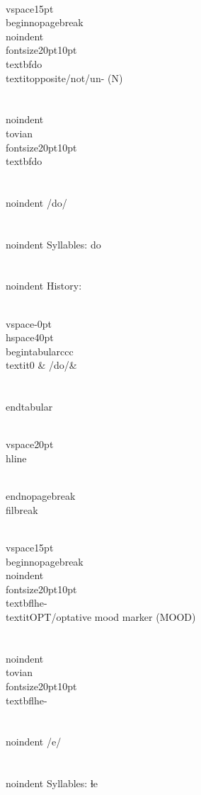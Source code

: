 \\vspace{15pt}
\\begin{nopagebreak}
\\noindent{\\fontsize{20pt}{10pt}\\textbf{do} } \\textit{opposite/not/un-} (N)\\\\
\\noindent {\\tovian \\fontsize{20pt}{10pt} \\textbf{do} }\\\\
\\noindent /d{\textprimstress}o/\\\\
\\noindent Syllables: do\\\\


\\noindent History:

\\vspace{-0pt}
\\hspace{40pt}
\\begin{tabular}{ccc}
\\textit{0} & /do/& \\\\
\\end{tabular}

\\vspace{20pt}\\hline

\\end{nopagebreak}
\\filbreak



\\vspace{15pt}
\\begin{nopagebreak}
\\noindent{\\fontsize{20pt}{10pt}\\textbf{lhe-} } \\textit{OPT/optative mood marker} (MOOD)\\\\
\\noindent {\\tovian \\fontsize{20pt}{10pt} \\textbf{lhe-} }\\\\
\\noindent /{\textbeltl}{\textprimstress}e/\\\\
\\noindent Syllables: ɬe\\\\


